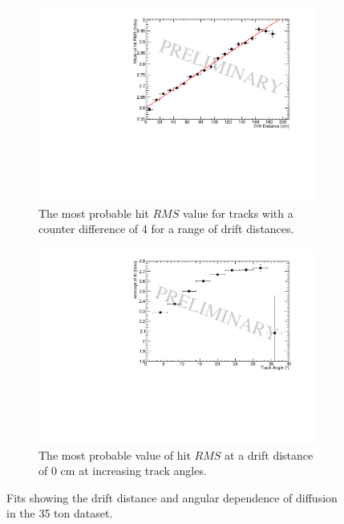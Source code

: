\begin{figure}[h!]
  \centering
  \begin{subfigure}{0.45\textwidth}
    \centering
    \includegraphics[width=\textwidth]{CounterDiff4_Data}
    \caption{The most probable hit $RMS$ value for tracks with a counter difference of 4 for a range of drift distances.}
    \label{fig:CDiff4DataFit}
  \end{subfigure}
  \hspace{0.08\textwidth}
  \begin{subfigure}{0.45\textwidth}
    \centering
    \includegraphics[width=\textwidth]{InterceptCanvasData}
    \caption{The most probable value of hit $RMS$ at a drift distance of 0 cm at increasing track angles.}
  \end{subfigure}
  \caption[The drift distance and angular dependence of diffusion in the 35 ton data]
          {Fits showing the drift distance and angular dependence of diffusion in the 35 ton dataset.}
          \label{fig:DiffDataFit}
\end{figure}

